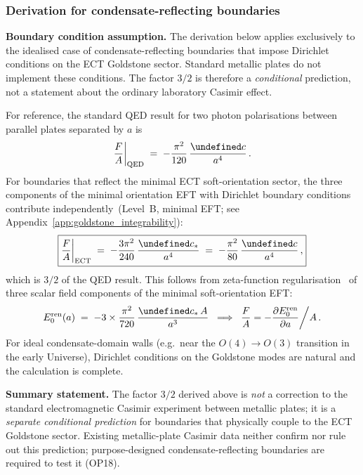 \documentclass[11pt,a4paper]{article}
\let\hbar\undefined
\numberwithin{equation}{section}
\begin{document}
\subsubsection{Derivation for condensate-reflecting boundaries}

\textbf{Boundary condition assumption.}
The derivation below applies exclusively to the idealised case of
condensate-reflecting boundaries that impose Dirichlet conditions on
the ECT Goldstone sector.  Standard metallic plates do not implement
these conditions.  The factor $3/2$ is therefore a
\emph{conditional} prediction, not a statement about the ordinary
laboratory Casimir effect.

For reference, the standard QED result for two photon polarisations
between parallel plates separated by $a$ is
\begin{equation}
  \frac{F}{A}\bigg|_{\rm QED}
  \;=\;
  -\frac{\pi^2}{120}\,\frac{\hbar c}{a^4}\,.
  \label{eq:casimir_qed}
\end{equation}
For boundaries that reflect the minimal ECT soft-orientation sector,
the three components of the minimal orientation EFT with Dirichlet
boundary conditions contribute independently~(Level~B, minimal EFT;
see Appendix~\ref{app:goldstone_integrability}):
\begin{equation}
  \boxed{%
  \frac{F}{A}\bigg|_{\rm ECT}
  \;=\;
  -\frac{3\pi^2}{240}\,\frac{\hbar c_*}{a^4}
  \;=\;
  -\frac{\pi^2}{80}\,\frac{\hbar c}{a^4}\,,
  }
  \label{eq:casimir_ect}
\end{equation}
which is $3/2$ of the QED result.  This follows from zeta-function
regularisation~\cite{BirrellDavies1982} of three scalar field components
of the minimal soft-orientation EFT:
\begin{equation}
  E_0^{\rm ren}(a) \;=\; -3\times\frac{\pi^2}{720}\,\frac{\hbar c_*\,A}{a^3}
  \;\implies\;
  \frac{F}{A} = -\frac{\partial E_0^{\rm ren}}{\partial a}\bigg/A\,.
\end{equation}
For ideal condensate-domain walls (e.g.\ near the $O(4)\to O(3)$ transition
in the early Universe), Dirichlet conditions on the Goldstone modes are
natural and the calculation is complete.

\textbf{Summary statement.}
The factor $3/2$ derived above is \emph{not} a correction to the standard
electromagnetic Casimir experiment between metallic plates;
it is a \emph{separate conditional prediction} for boundaries that
physically couple to the ECT Goldstone sector.
Existing metallic-plate Casimir data neither confirm nor rule out this
prediction; purpose-designed condensate-reflecting boundaries are
required to test it (OP18).
\end{document}
